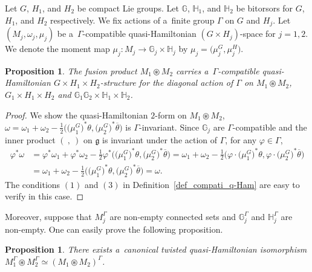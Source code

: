 \documentclass[10pt,a4paper]{amsart}
\numberwithin{equation}{section}
\newtheorem{Proposition}[Theorem]{Proposition}
\theoremstyle{definition}
\newcommand{\bG}{\mathbb{G}}
\newcommand{\bH}{\mathbb{H}}
\begin{document}
Let $G$, $H_1$, and $H_2$ be compact Lie groups.
Let $\bG$, $\bH_1$, and $\bH_2$ be bitorsors for $G$, $H_1$, and $H_2$ respectively.
We fix actions of a~finite group $\Gamma$ on $G$ and $H_j$.
Let $(M_j, \omega_j, \mu_j)$ be a~$\Gamma$-compatible quasi-Hamiltonian $(G\times H_j)$-space for $j=1,2$.
We denote the moment map $\mu_j \colon M_j \to \bG_j \times \bH_j$ by $\mu_j =\bigl(\mu^{G}_j,\mu^{H}_j\bigr)$.

\begin{Proposition}
 The fusion product $M_1 \circledast M_2$ carries a~$\Gamma$-compatible quasi-Hamiltonian $G \times H_1 \times H_2$-structure for the diagonal action of $\Gamma$ on $M_1 \circledast M_2$, $G_1 \times H_1 \times H_2$ and $\bG_1 \bG_2 \times \bH_1 \times \bH_2$.
\end{Proposition}

\begin{proof}
 We show the quasi-Hamiltonian $2$-form on $M_1 \circledast M_2$, $\omega = \omega_1 + \omega_2 - \frac{1}{2}\bigl(\bigl(\mu_1^{G}\bigr)^*\theta, \bigl(\mu_2^{G}\bigr)^* \overline{\theta}\bigr)$
 is $\Gamma$-invariant. Since $\bG_j$ are $\Gamma$-compatible and the inner product $(\ ,\ )$ on $\mathfrak{g}$ is invariant under the action of $\Gamma$, for any $\varphi \in \Gamma$,
 \begin{align*}
 \varphi^*\omega &= \varphi ^* \omega_1 + \varphi ^* \omega_2 -\frac{1}{2}\varphi^*\bigl(\bigl(\mu_1^G\bigr)^*\theta,\bigl(\mu_2^G\bigr)^*\overline{\theta}\bigr) = \omega_1 + \omega_2 -\frac{1}{2}\bigl(\varphi \cdot \bigl(\mu_1^G\bigr)^*\theta, \varphi \cdot \bigl(\mu_2^G\bigr)^* \overline{\theta}\bigr) \\
 &= \omega_1 + \omega_2 -\frac{1}{2}\bigl(\bigl(\mu_1^G\bigr)^*\theta, \bigl(\mu_2^G\bigr)^* \overline{\theta}\bigr) = \omega.
 \end{align*}
 The conditions $(1)$ and $(3)$ in Definition~\ref{def_compati_q-Ham} are easy to verify in this case.
\end{proof}

Moreover, suppose that $M_j^{\Gamma}$ are non-empty connected sets and $\bG_j^{\Gamma}$ and $\bH_j^{\Gamma}$ are non-empty.
One can easily prove the following proposition.

\begin{Proposition}\label{fusion_and_fixedpoints}
 There exists a~canonical twisted quasi-Hamiltonian isomorphism $M_1^{\Gamma} \circledast M_2^{\Gamma} \simeq (M_1 \circledast M_2)^{\Gamma}$.
\end{Proposition}
\end{document}
